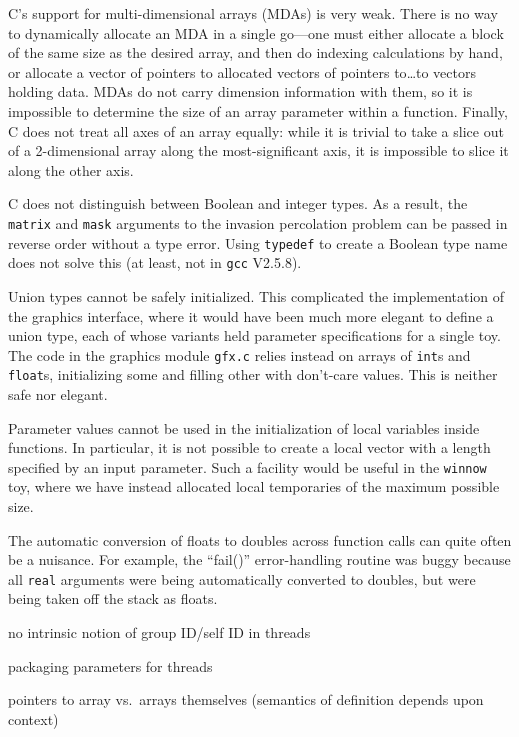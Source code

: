 \begin{itemlist}
\item	C's support for multi-dimensional arrays (MDAs) is very weak.
	There is no way to dynamically allocate an MDA in a single go---one must either
	allocate a block of the same size as the desired array,
	and then do indexing calculations by hand,
	or allocate a vector of pointers to allocated vectors of pointers to{\ldots}to vectors holding data.
	MDAs do not carry dimension information with them,
	so it is impossible to determine the size of an array parameter within a function.
	Finally,
	C does not treat all axes of an array equally:
	while it is trivial to take a slice out of a 2-dimensional array along the most-significant axis,
	it is impossible to slice it along the other axis.
\item	C does not distinguish between Boolean and integer types.
	As a result,
	the {\tt{matrix}} and {\tt{mask}} arguments to the invasion percolation problem
	can be passed in reverse order without a type error.
	Using {\tt{typedef}} to create a Boolean type name does not solve this
	(at least, not in {\tt{gcc}} V2.5.8).
\item	Union types cannot be safely initialized.
	This complicated the implementation of the graphics interface,
	where it would have been much more elegant to define a union type,
	each of whose variants held parameter specifications for a single toy.
	The code in the graphics module {\tt{gfx.c}} relies instead on arrays of {\tt{int}}s and {\tt{float}}s,
	initializing some and filling other with don't-care values.
	This is neither safe nor elegant.
\item	Parameter values cannot be used in the initialization of local variables inside functions.
	In particular,
	it is not possible to create a local vector with a length specified by an input parameter.
	Such a facility would be useful in the {\tt{winnow}} toy,
	where we have instead allocated local temporaries of the maximum possible size.
\item	The automatic conversion of floats to doubles across function calls can quite often be a nuisance.
	For example, the ``fail()'' error-handling routine was buggy because
	all \verb`real` arguments were being automatically converted to doubles,
	but were being taken off the stack as floats.
\item	no intrinsic notion of group ID/self ID in threads
\item	packaging parameters for threads
\item	pointers to array vs.\ arrays themselves (semantics of definition depends upon context)
\end{itemlist}
